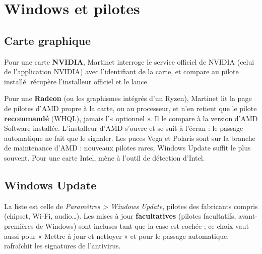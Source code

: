 \section{Windows et pilotes}\label{sec:windows}


\subsection{Carte graphique}

Pour une carte \textbf{NVIDIA}, Martinet interroge le service officiel de NVIDIA (celui de
l'application NVIDIA) avec l'identifiant de la carte, et compare au pilote installé.
 récupère l'installeur officiel et le lance.

Pour une \textbf{Radeon} (ou les graphismes intégrés d'un Ryzen), Martinet lit la page de pilotes
d'AMD propre à la carte, ou au processeur, et n'en retient que le pilote \textbf{recommandé} (WHQL),
jamais l'« optionnel ». Il le compare à la version d'AMD Software installée. L'installeur d'AMD
s'ouvre et se suit à l'écran : le passage automatique ne fait que le signaler. Les puces Vega et
Polaris sont sur la branche de maintenance d'AMD : nouveaux pilotes rares, Windows Update suffit le
plus souvent. Pour une carte Intel,  mène à l'outil de détection d'Intel.

\subsection{Windows Update}

La liste est celle de \textit{Paramètres > Windows Update}, pilotes des fabricants compris (chipset,
Wi-Fi, audio…). Les mises à jour \textbf{facultatives} (pilotes facultatifs, avant-premières de
Windows) sont incluses tant que la case  est cochée ; ce
choix vaut aussi pour « Mettre à jour et nettoyer » et pour le passage automatique.
 rafraîchit les signatures de l'antivirus.


